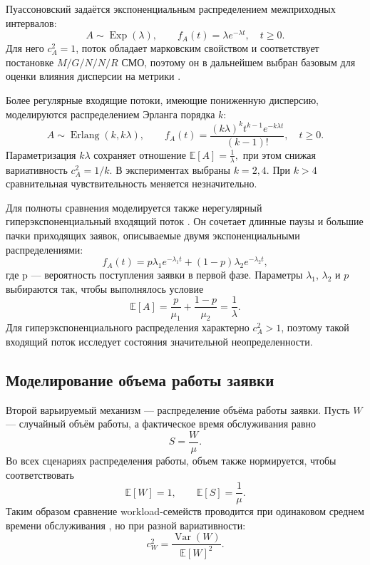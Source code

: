 Пуассоновский задаётся экспоненциальным распределением межприходных интервалов:
$$
A \sim \operatorname{Exp}(\lambda),
\qquad
f_A(t)=\lambda e^{-\lambda t}, \quad t \geq 0.
$$
Для него $c_A^2=1$, поток обладает марковским свойством и соответствует постановке $M/G/N/N/R$ СМО, поэтому он в дальнейшем выбран базовым для оценки влияния дисперсии на метрики \cite{bocharov_pechinkin_tmo,adan_resing2015_queueing_systems}. 

Более регулярные входящие потоки, имеющие пониженную дисперсию, моделируются распределением Эрланга порядка $k$:
$$
A \sim \operatorname{Erlang}(k,k\lambda),
\qquad
f_A(t)=\frac{(k\lambda)^k t^{k-1}e^{-k\lambda t}}{(k-1)!}, \quad t \geq 0.
$$
Параметризация $k\lambda$ сохраняет отношение $\mathbb{E}[A]=\frac{1}{\lambda},$ при этом снижая вариативность $c_A^2=1/k$. В экспериментах выбраны $k = 2, 4$. При $k>4$ сравнительная чувствительность меняется незначительно\cite{adan_resing2015_queueing_systems,law2015_simulation_modeling}. 

Для полноты сравнения моделируется также нерегулярный гиперэкспоненциальный входящий поток \cite{vishnevskii_dudin_correlated_arrivals_2017,law2015_simulation_modeling}. Он сочетает длинные паузы и большие пачки приходящих заявок, описываемые двумя экспоненциальными распределениями: 
$$
f_A(t)=p\lambda_1 e^{-\lambda_1 t}+(1-p)\lambda_2 e^{-\lambda_2 t},
$$
где p --- вероятность поступления заявки в первой фазе. 
Параметры $\lambda_1$, $\lambda_2$ и $p$ выбираются так, чтобы выполнялось условие
$$
\mathbb{E}[A]=\frac{p}{\mu_1}+\frac{1-p}{\mu_2}=\frac{1}{\lambda}.
$$
Для гиперэкспоненциального распределения характерно $c_A^2>1$, поэтому такой входящий поток исследует состояния значительной неопределенности.

\subsection{Моделирование объема работы заявки}
\label{subsec:workload_process}

Второй варьируемый механизм --- распределение объёма работы заявки. Пусть $W$ --- случайный объём работы, а фактическое время обслуживания равно
$$
S=\frac{W}{\mu}.
$$
Во всех сценариях распределения работы, объем также нормируется, чтобы соответствовать 
$$
\mathbb{E}[W]=1,
\qquad
\mathbb{E}[S]=\frac{1}{\mu}.
$$
Таким образом сравнение workload-семейств проводится при одинаковом среднем времени обслуживания \cite{fishman1996_monte_carlo,law2015_simulation_modeling}, но при разной вариативности:
$$
c_W^2=\frac{\operatorname{Var}(W)}{\mathbb{E}[W]^2}.
$$ 

